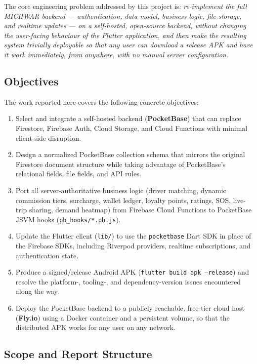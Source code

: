 \documentclass[11pt,a4paper]{article}
\begin{document}
The core engineering problem addressed by this project is:
\textit{re-implement the full MICHWAR backend --- authentication, data
model, business logic, file storage, and realtime updates --- on a
self-hosted, open-source backend, without changing the user-facing behaviour
of the Flutter application, and then make the resulting system trivially
deployable so that any user can download a release APK and have it work
immediately, from anywhere, with no manual server configuration.}

\subsection{Objectives}

The work reported here covers the following concrete objectives:

\begin{enumerate}[nosep]
  \item Select and integrate a self-hosted backend (\textbf{PocketBase})
    that can replace Firestore, Firebase Auth, Cloud Storage, and Cloud
    Functions with minimal client-side disruption.
  \item Design a normalized PocketBase collection schema that mirrors the
    original Firestore document structure while taking advantage of
    PocketBase's relational fields, file fields, and API rules.
  \item Port all server-authoritative business logic (driver matching,
    dynamic commission tiers, surcharge, wallet ledger, loyalty points,
    ratings, SOS, live-trip sharing, demand heatmap) from Firebase Cloud
    Functions to PocketBase JSVM hooks (\texttt{pb\_hooks/*.pb.js}).
  \item Update the Flutter client (\texttt{lib/}) to use the
    \texttt{pocketbase} Dart SDK in place of the Firebase SDKs, including
    Riverpod providers, realtime subscriptions, and authentication state.
  \item Produce a signed/release Android APK (\texttt{flutter build apk
    --release}) and resolve the platform-, tooling-, and dependency-version
    issues encountered along the way.
  \item Deploy the PocketBase backend to a publicly reachable, free-tier
    cloud host (\textbf{Fly.io}) using a Docker container and a persistent
    volume, so that the distributed APK works for any user on any network.
\end{enumerate}

\subsection{Scope and Report Structure}
\end{document}
